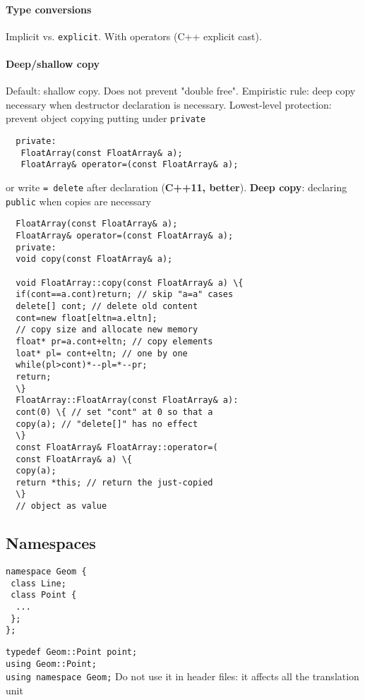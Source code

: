 \documentclass{article}
\begin{document}
\paragraph{Type conversions}
Implicit vs. \texttt{explicit}.
With operators (C++ explicit cast).

\paragraph{Deep/shallow copy}
Default: shallow copy. Does not prevent "double free".
Empiristic rule: deep copy necessary when destructor declaration is necessary.
Lowest-level protection: prevent object copying putting under \texttt{private}
\begin{lstlisting}
  private:
   FloatArray(const FloatArray& a);
   FloatArray& operator=(const FloatArray& a);
\end{lstlisting}
or write \texttt{= delete} after declaration (\textbf{C++11, better}).
\textbf{Deep copy}: declaring \texttt{public} when copies are necessary
\begin{lstlisting}
  FloatArray(const FloatArray& a);
  FloatArray& operator=(const FloatArray& a);
  private:
  void copy(const FloatArray& a);
  
  void FloatArray::copy(const FloatArray& a) \{
  if(cont==a.cont)return; // skip "a=a" cases
  delete[] cont; // delete old content
  cont=new float[eltn=a.eltn];
  // copy size and allocate new memory
  float* pr=a.cont+eltn; // copy elements
  loat* pl= cont+eltn; // one by one
  while(pl>cont)*--pl=*--pr;
  return;
  \}
  FloatArray::FloatArray(const FloatArray& a):
  cont(0) \{ // set "cont" at 0 so that a
  copy(a); // "delete[]" has no effect
  \}
  const FloatArray& FloatArray::operator=(
  const FloatArray& a) \{
  copy(a);
  return *this; // return the just-copied
  \}
  // object as value
\end{lstlisting}

\subsection{Namespaces}
\begin{lstlisting}
namespace Geom { 
 class Line; 
 class Point { 
  ... 
 };  
}; 
\end{lstlisting}
\texttt{typedef Geom::Point point;} \\
\texttt{using Geom::Point;} \\
\texttt{using namespace Geom;} Do not use it in header files: it affects all the translation unit \\
 
\end{document}
